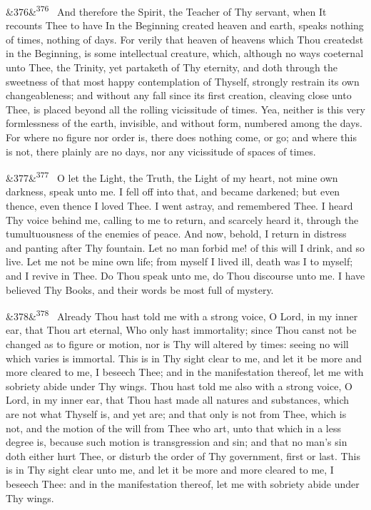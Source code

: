\documentclass[12pt]{article}
\newcommand{\para}[1][]{\par\noindent\ifx&#1&\else\textsuperscript{\footnotesize #1}~\fi}
\begin{document}
\para[376] And therefore the Spirit, the Teacher of Thy servant, when It recounts Thee to have In the Beginning created heaven and earth, speaks nothing of times, nothing of days. For verily that heaven of heavens which Thou createdst in the Beginning, is some intellectual creature, which, although no ways coeternal unto Thee, the Trinity, yet partaketh of Thy eternity, and doth through the sweetness of that most happy contemplation of Thyself, strongly restrain its own changeableness; and without any fall since its first creation, cleaving close unto Thee, is placed beyond all the rolling vicissitude of times. Yea, neither is this very formlessness of the earth, invisible, and without form, numbered among the days. For where no figure nor order is, there does nothing come, or go; and where this is not, there plainly are no days, nor any vicissitude of spaces of times.

\para[377] O let the Light, the Truth, the Light of my heart, not mine own darkness, speak unto me. I fell off into that, and became darkened; but even thence, even thence I loved Thee. I went astray, and remembered Thee. I heard Thy voice behind me, calling to me to return, and scarcely heard it, through the tumultuousness of the enemies of peace. And now, behold, I return in distress and panting after Thy fountain. Let no man forbid me! of this will I drink, and so live. Let me not be mine own life; from myself I lived ill, death was I to myself; and I revive in Thee. Do Thou speak unto me, do Thou discourse unto me. I have believed Thy Books, and their words be most full of mystery.

\para[378] Already Thou hast told me with a strong voice, O Lord, in my inner ear, that Thou art eternal, Who only hast immortality; since Thou canst not be changed as to figure or motion, nor is Thy will altered by times: seeing no will which varies is immortal. This is in Thy sight clear to me, and let it be more and more cleared to me, I beseech Thee; and in the manifestation thereof, let me with sobriety abide under Thy wings. Thou hast told me also with a strong voice, O Lord, in my inner ear, that Thou hast made all natures and substances, which are not what Thyself is, and yet are; and that only is not from Thee, which is not, and the motion of the will from Thee who art, unto that which in a less degree is, because such motion is transgression and sin; and that no man's sin doth either hurt Thee, or disturb the order of Thy government, first or last. This is in Thy sight clear unto me, and let it be more and more cleared to me, I beseech Thee: and in the manifestation thereof, let me with sobriety abide under Thy wings.
\end{document}
